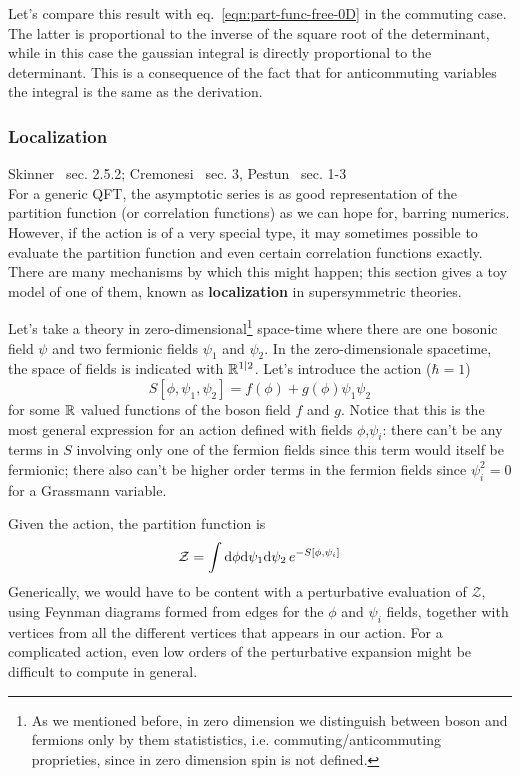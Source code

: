 \documentclass[../main/main.tex]{subfiles}
\begin{document}
Let's compare this result with eq.~\eqref{eqn:part-func-free-0D} in the commuting case. The latter is proportional to the inverse of the square root of the determinant, while in this case the gaussian integral is directly proportional to the determinant. This is a consequence of the fact that for anticommuting variables the integral is the same as the derivation.

\subsubsection{Localization}

\textsf{Skinner~\cite{Skinner:2018aa} sec. 2.5.2; Cremonesi~\cite{Cremonesi:2013aa} sec. 3, Pestun~\cite{Pestun_2012} sec. 1-3}\\

For a generic QFT, the asymptotic series is as good representation of the partition function (or correlation functions) as we can hope for, barring numerics. However, if the action is of a very special type, it may sometimes possible to evaluate the partition function and even certain correlation functions exactly. There are many mechanisms by which this might happen; this section gives a toy model of one of them, known as \textbf{localization} in supersymmetric theories. 

Let's take a theory in zero-dimensional\footnote{As we mentioned before, in zero dimension we distinguish between boson and fermions only by them statististics, i.e. commuting/anticommuting proprieties, since in zero dimension spin is not defined.} space-time where there are one bosonic field $\psi$ and two fermionic fields $\psi_1$ and $\psi_2$. In the zero-dimensionale spacetime, the space of fields is indicated with $\mathbb{R}^{1|2}$. Let's introduce the action ($\hbar=1$)
\[S[\phi,\psi_1,\psi_2]=f(\phi)+g(\phi)\psi_1\psi_2\]
for some $\mathbb{R}$ valued functions of the boson field $f$ and $g$. Notice that this is the most general expression for an action defined with fields $\phi$,$\psi_i$: there can't be any terms in $S$ involving only one of the fermion fields since this term would itself be fermionic; there also can't be higher order terms in the fermion fields since $\psi^2_i=0$ for a Grassmann variable. 

Given the action, the partition function is
\begin{equation}\label{eqn:-part-func-localization}
\mathcal Z=\int\textup{d}\phi\textup{d}\psi_1\textup{d}\psi_2\,e^{-S[\phi,\psi_i]}
\end{equation}
Generically, we would have to be content with a perturbative evaluation of $\mathcal Z$, using Feynman diagrams formed from edges for the $\phi$ and  $\psi_i$ fields, together with vertices from all the different vertices that appears in our action. For a complicated action, even low orders of the perturbative expansion might be difficult to compute in general. 
\end{document}
